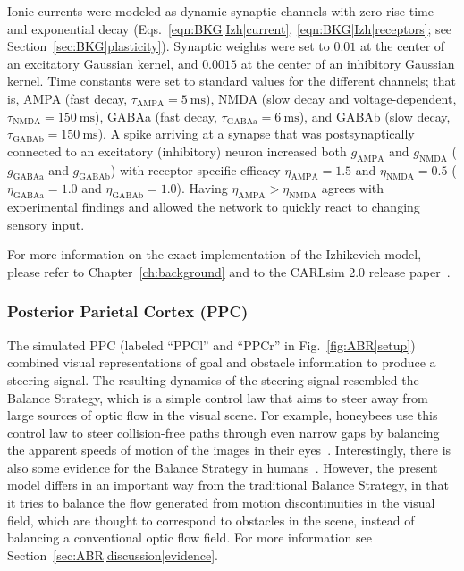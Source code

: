 Ionic currents were modeled as dynamic synaptic channels with
zero rise time and exponential decay
(Eqs.~\ref{eqn:BKG|Izh|current}, \ref{eqn:BKG|Izh|receptors};
see Section~\ref{sec:BKG|plasticity}).
Synaptic weights were set to $0.01$ at the center of an excitatory
Gaussian kernel,
and $0.0015$ at the center of an inhibitory Gaussian kernel.
Time constants were set to standard values for the different channels;
that is, 
AMPA (fast decay, $\tau_{\textrm{AMPA}} = \SI{5}{\milli\second}$), 
NMDA (slow decay and voltage-dependent, 
$\tau_{\textrm{NMDA}} = \SI{150}{\milli\second}$), 
GABAa (fast decay, 
$\tau_{\textrm{GABAa}} = \SI{6}{\milli\second}$),
and GABAb (slow decay, 
$\tau_{\textrm{GABAb}} = \SI{150}{\milli\second}$). A
spike arriving at a synapse that was postsynaptically connected
to an excitatory (inhibitory) neuron increased both 
$g_{\textrm{AMPA}}$ and $g_{\textrm{NMDA}}$ 
($g_{\textrm{GABAa}}$ and $g_{\textrm{GABAb}}$)
with receptor-specific efficacy 
$\eta_{\textrm{AMPA}} = 1.5$ and 
$\eta_{\textrm{NMDA}} = 0.5$
($\eta_{\textrm{GABAa}} = 1.0$ and 
$\eta_{\textrm{GABAb}} = 1.0$). 
Having $\eta_{\textrm{AMPA}} > \eta_{\textrm{NMDA}}$
agrees with experimental findings \citep{Myme2003}
and allowed the network to quickly react to changing sensory input.

For more information on the exact implementation of the Izhikevich
model, please refer to Chapter~\ref{ch:background} and to the
CARLsim 2.0 release paper~\citep{Richert2011}.


\subsubsection{Posterior Parietal Cortex (PPC)}
\label{sec:ABR|model|PPC}
The simulated \ac{PPC} (labeled ``PPCl'' and ``PPCr'' in 
Fig.~\ref{fig:ABR|setup})
combined visual representations of goal and obstacle information
to produce a steering signal. The resulting dynamics of the steering
signal resembled the Balance Strategy, which is a simple control
law that aims to steer away from large sources of optic flow in the
visual scene. For example, honeybees use this control law to steer
collision-free paths through even narrow gaps by balancing the
apparent speeds of motion of the images in their 
eyes~\citep{Srinivasan1997}. 
Interestingly, there is also some evidence for the
Balance Strategy in 
humans~\citep{Kountouriotis2013}. However,
the present model differs in an important way from the traditional
Balance Strategy, in that it tries to balance the flow generated
from motion discontinuities in the visual field, which are thought
to correspond to obstacles in the scene, instead of balancing a
conventional optic flow field. For more information see 
Section~\ref{sec:ABR|discussion|evidence}.

